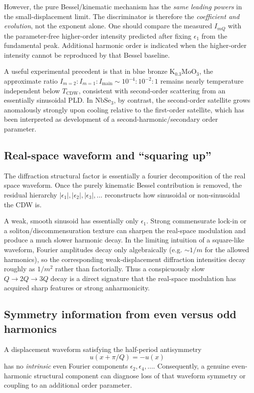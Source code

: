 \documentclass[11pt]{article}
\newcommand{\e}{\epsilon}
\begin{document}
However, the pure Bessel/kinematic mechanism has the \emph{same leading powers} in the small-displacement limit.  The discriminator is therefore the \emph{coefficient and evolution}, not the exponent alone.  One should compare the measured $I_{mQ}$ with the parameter-free higher-order intensity predicted after fixing $\e_1$ from the fundamental peak.  Additional harmonic order is indicated when the higher-order intensity cannot be reproduced by that Bessel baseline.

A useful experimental precedent is that in blue bronze $\mathrm{K}_{0.3}\mathrm{MoO}_3$, the approximate ratio $I_{m=2}:I_{m=1}:I_{\mathrm{main}}\sim10^{-4}:10^{-2}:1$ remains nearly temperature independent below $T_{\mathrm{CDW}}$, consistent with second-order scattering from an essentially sinusoidal PLD.  In $\mathrm{NbSe}_3$, by contrast, the second-order satellite grows anomalously strongly upon cooling relative to the first-order satellite, which has been interpreted as development of a second-harmonic/secondary order parameter.\cite{vanSmaalen2005}

\subsection*{Real-space waveform and ``squaring up''}
The diffraction structural factor is essentially a fourier decomposition of the real space waveform. Once the purely kinematic Bessel contribution is removed, the residual hierarchy $|\e_1|,|\e_2|,|\e_3|,\ldots$ reconstructs how sinusoidal or non-sinusoidal the CDW is.

A weak, smooth sinusoid has essentially only $\e_1$.  Strong commensurate lock-in or a soliton/discommensuration texture can sharpen the real-space modulation and produce a much slower harmonic decay.  In the limiting intuition of a square-like waveform, Fourier amplitudes decay only algebraically (e.g. $\sim1/m$ for the allowed harmonics), so the corresponding weak-displacement diffraction intensities decay roughly as $1/m^2$ rather than factorially.  Thus a conspicuously slow $Q\to2Q\to3Q$ decay is a direct signature that the real-space modulation has acquired sharp features or strong anharmonicity.

\subsection*{Symmetry information from even versus odd harmonics}
A displacement waveform satisfying the half-period antisymmetry
\begin{equation}
    u(x+\pi/Q)=-u(x)
\end{equation}
has no \emph{intrinsic} even Fourier components $\e_2,\e_4,\ldots$.  Consequently, a genuine even-harmonic structural component can diagnose loss of that waveform symmetry or coupling to an additional order parameter.
\end{document}
